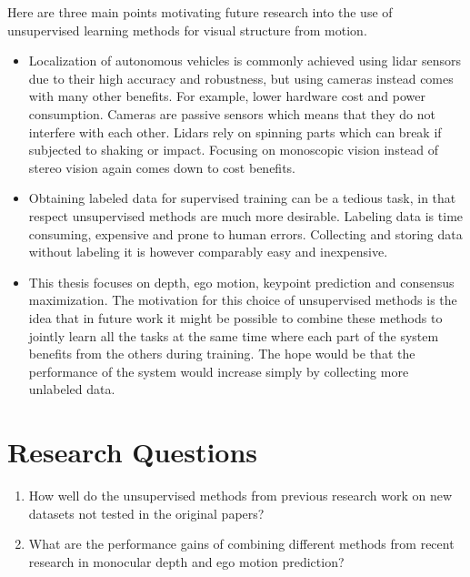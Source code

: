 Here are three main points motivating future research into the use of unsupervised learning methods for visual structure from motion.


\begin{itemize}
	\item Localization of autonomous vehicles is commonly  achieved using lidar sensors due to their high accuracy and robustness, but using cameras instead comes with many other benefits\cite{lidarvscamera}. For example, lower hardware cost and power consumption. Cameras are passive sensors which means that they do not interfere with each other. Lidars rely on spinning parts which can break if subjected to shaking or impact. Focusing on monoscopic vision instead of stereo vision again comes down to cost benefits.
	
	\item Obtaining labeled data for supervised training can be a tedious task, in that respect unsupervised methods are much more desirable. Labeling data is time consuming, expensive and prone to human errors. Collecting and storing data without labeling it is however comparably easy and inexpensive.
	
	\item This thesis focuses on depth, ego motion, keypoint prediction and consensus maximization. The motivation for this choice of unsupervised methods is the idea that in future work it might be possible to combine these methods to jointly learn all the tasks at the same time where each part of the system benefits from the others during training. The hope would be that the performance of the system would increase simply by collecting more unlabeled data.
\end{itemize}

\section{Research Questions}

\begin{enumerate}
	
	\item How well do the unsupervised methods from previous research work on new datasets not tested in the original papers?
	
	\item What are the performance gains of combining different methods from recent research in monocular depth and ego motion prediction?
	
\end{enumerate}

